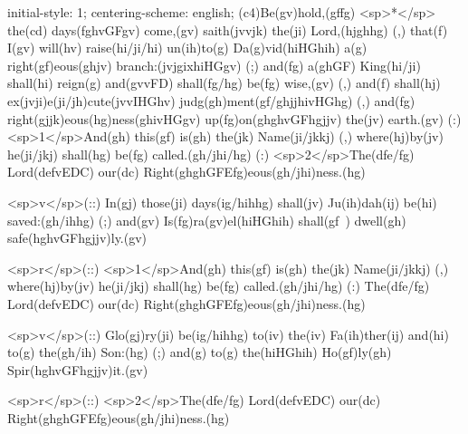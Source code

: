 initial-style: 1;
centering-scheme: english;
(c4)Be(gv)hold,(gffg) <sp>*</sp> the(cd) days(fghvGFgv) come,(gv) saith(jvvjk) the(ji) Lord,(hjghhg) (,) that(f) I(gv) will(hv) raise(hi/ji/hi) un(ih)to(g) Da(g)vid(hiHGhih) a(g) right(gf)eous(ghjv) branch:(jvjgixhiHGgv) (;) and(fg) a(ghGF) King(hi/ji) shall(hi) reign(g) and(gvvFD) shall(fg/hg) be(fg) wise,(gv) (,) and(f) shall(hj) ex(jvji)e(ji/jh)cute(jvvIHGhv) judg(gh)ment(gf/ghjjhivHGhg) (,) and(fg) right(gjjk)eous(hg)ness(ghivHGgv) up(fg)on(ghghvGFhgjjv) the(jv) earth.(gv) (:) <sp>1</sp>And(gh) this(gf) is(gh) the(jk) Name(ji/jkkj) (,) where(hj)by(jv) he(ji/jkj) shall(hg) be(fg) called.(gh/jhi/hg) (:) <sp>2</sp>The(dfe/fg) Lord(defvEDC) our(dc) Right(ghghGFEfg)eous(gh/jhi)ness.(hg) 

<sp>v</sp>(::) In(gj) those(ji) days(ig/hihhg) shall(jv) Ju(ih)dah(ij) be(hi) saved:(gh/ihhg) (;) and(gv) Is(fg)ra(gv)el(hiHGhih) shall(gf~) dwell(gh) safe(hghvGFhgjjv)ly.(gv) 

<sp>r</sp>(::) <sp>1</sp>And(gh) this(gf) is(gh) the(jk) Name(ji/jkkj) (,) where(hj)by(jv) he(ji/jkj) shall(hg) be(fg) called.(gh/jhi/hg) (:) The(dfe/fg) Lord(defvEDC) our(dc) Right(ghghGFEfg)eous(gh/jhi)ness.(hg) 

<sp>v</sp>(::) Glo(gj)ry(ji) be(ig/hihhg) to(iv) the(iv) Fa(ih)ther(ij) and(hi) to(g) the(gh/ih) Son:(hg) (;) and(g) to(g) the(hiHGhih) Ho(gf)ly(gh) Spir(hghvGFhgjjv)it.(gv)

<sp>r</sp>(::) <sp>2</sp>The(dfe/fg) Lord(defvEDC) our(dc) Right(ghghGFEfg)eous(gh/jhi)ness.(hg) 